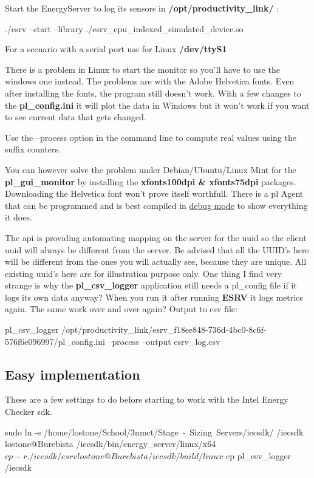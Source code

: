 Start the EnergyServer to log its sensors in \textbf{/opt/productivity\_link/} :
\begin{codelisting}
	./esrv --start --library ./esrv_cpu_indexed_simulated_device.so
\end{codelisting}
For a scenario with a serial port use for Linux \textbf{/dev/ttyS1}

There is a problem in Linux to start the monitor so you'll have to use the windows one instead. The problems are with the Adobe Helvetica fonts.
Even after installing the fonts, the program still doesn't work. With a few changes to the \textbf{pl\_config.ini} it will plot the data in Windows but it won't work if you want to see current data that gets changed.

Use the --process option in the command line to compute real values using the suffix counters.

You can however solve the problem under Debian/Ubuntu/Linux Mint for the \textbf{pl\_gui\_monitor} by installing the \textbf{xfonts\-100dpi \& xfonts\-75dpi} packages. Downloading the Helvetica font won't prove itself worthfull.
There is a \gls{pl} Agent that can be programmed and is best compiled in \underline{debug mode} to show everything it does.

The \gls{api} is providing automating mapping on the server for the \gls{uuid} so the client \gls{uuid}  will always be different from the server. 
Be advised that all the UUID's here will be different from the ones you will actually see, because they are unique. All existing \gls{uuid}'s here are for illustration purpose only.
One thing I find very strange is why the \textbf{pl\_csv\_logger} application still needs a pl\_config file if it logs its own data anyway? When you run it after running \textbf{ESRV} it logs metrics again. The same work over and over again?
Output to csv file:
\begin{codelisting}
	pl_csv_logger /opt/productivity_link/esrv_f18ee848-736d-4bc0-8c6f-576f6e096997/pl_config.ini --process --output esrv_log.csv
\end{codelisting}

\subsection{Easy implementation}
These are a few settings to do before starting to work with the Intel Energy Checker \gls{sdk}.
\begin{codelisting}
sudo ln -s /home/lostone/School/3nmct/Stage\ -\ Sizing\ Servers/iecsdk/ /iecsdk
lostone@Burebista /iecsdk/bin/energy_server/linux/x64 $ cp -r . /iecsdk/esrv
lostone@Burebista /iecsdk/build/linux $ cp pl_csv_logger /iecsdk
\end{codelisting}
